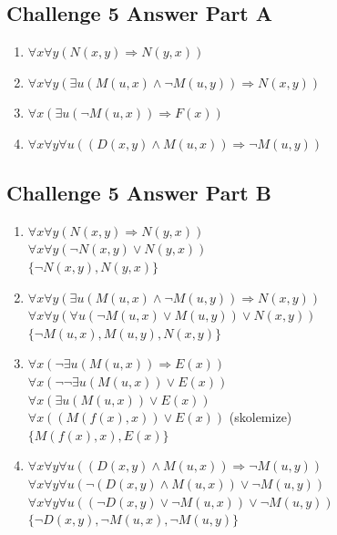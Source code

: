 \documentclass[12pt]{article}
\newcommand{\impl}{\mathbin{\Rightarrow}}
\newcommand\tab[1][1cm]{\hspace*{#1}}
\begin{document}
\subsection*{Challenge 5 Answer Part A}
\begin{enumerate}
\setlength{\itemsep}{-0.5ex}
\item
$\forall x \forall y (N(x, y) \impl N(y, x))$ \\
\item
$\forall x \forall y (\exists u (M(u, x) \land \neg M(u, y)) \impl N(x, y))$ \\
\item
$\forall x (\exists u (\neg M(u, x)) \impl F(x))$ \\
\item
$\forall x \forall y \forall u ((D(x, y) \land M(u, x)) \impl \neg M(u, y))$
\end{enumerate}

\subsection*{Challenge 5 Answer Part B}
\begin{enumerate}
\setlength{\itemsep}{-0.5ex}
\item
$\forall x \forall y (N(x, y) \impl N(y, x))$ \\
$\forall x \forall y (\neg N(x, y) \lor N(y, x))$ \\
$\{\neg N(x, y), N(y, x)\}$ \\
\item
$\forall x \forall y (\exists u (M(u, x) \land \neg M(u, y)) \impl N(x, y))$ \\
$\forall x \forall y (\forall u (\neg M(u, x) \lor M(u, y)) \lor N(x, y))$ \\
$\{\neg M(u, x), M(u, y), N(x, y)\}$ \\
\item
$\forall x (\neg \exists u (M(u, x)) \impl E(x))$ \\
$\forall x (\neg\neg\exists u (M(u, x)) \lor E(x))$ \\
$\forall x (\exists u (M(u, x)) \lor E(x))$ \\
$\forall x ((M(f(x), x)) \lor E(x))$ \tab (skolemize)\\
$\{M(f(x), x), E(x)\}$ \\
\item
$\forall x \forall y \forall u ((D(x, y) \land M(u, x)) \impl \neg M(u, y))$ \\
$\forall x \forall y \forall u (\neg(D(x, y) \land M(u, x)) \lor \neg M(u, y))$ \\
$\forall x \forall y \forall u ((\neg D(x, y) \lor \neg M(u, x)) \lor \neg M(u, y))$ \\
$\{\neg D(x, y), \neg M(u, x), \neg M(u, y)\}$\\
\end{enumerate}
\end{document}
